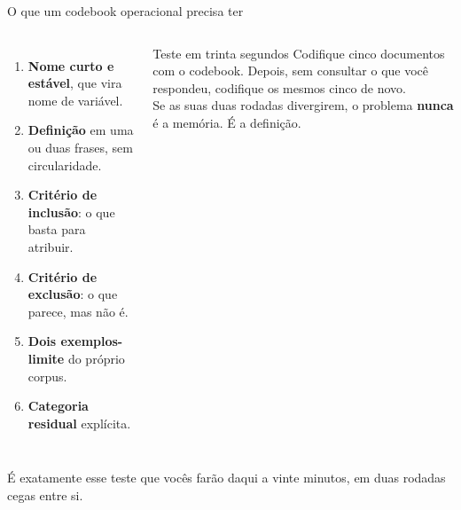\documentclass[11pt,aspectratio=169]{beamer}
\begin{document}
\begin{frame}{O que um codebook operacional precisa ter}
\begin{columns}[T]
\begin{enumerate}\small
  \item \textbf{Nome curto e estável}, que vira nome de variável.
  \item \textbf{Definição} em uma ou duas frases, sem circularidade.
  \item \textbf{Critério de inclusão}: o que basta para atribuir.
  \item \textbf{Critério de exclusão}: o que parece, mas não é.
  \item \textbf{Dois exemplos-limite} do próprio corpus.
  \item \textbf{Categoria residual} explícita.
\end{enumerate}
\begin{alertblock}{Teste em trinta segundos}
\small
Codifique cinco documentos com o codebook. Depois, sem consultar o que você
respondeu, codifique os mesmos cinco de novo.\\[0.15cm]
Se as suas duas rodadas divergirem, o problema \textbf{nunca} é a memória.
É a definição.
\end{alertblock}
\end{columns}
\vspace{0.15cm}
\centering
\small É exatamente esse teste que vocês farão daqui a vinte minutos, em duas
rodadas cegas entre si.
\end{frame}
\end{document}
